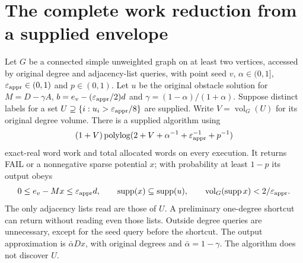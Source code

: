 \section{The complete work reduction from a supplied envelope}
\label{sec:op3-supplied-envelope-work}

\begin{theorem}
\label{thm:op3-supplied-envelope-work}
Let $G$ be a connected simple unweighted graph on at least two vertices,
accessed by original degree and adjacency-list queries, with point seed
$v$, $\alpha\in(0,1]$, $\varepsilon_{\mathrm{appr}}\in(0,1)$ and $p\in(0,1)$.
Let $u$ be the original obstacle solution for
$M=D-\gamma A$, $b=e_v-(\varepsilon_{\mathrm{appr}}/2)d$ and
$\gamma=(1-\alpha)/(1+\alpha)$. Suppose distinct labels for a set
$U\supseteq\{i:u_i>\varepsilon_{\mathrm{appr}}/8\}$ are supplied. Write
$V=\operatorname{vol}_G(U)$ for its original degree volume.
There is a supplied algorithm using
\[
 (1+V)\operatorname{polylog}
 (2+V+\alpha^{-1}+\varepsilon_{\mathrm{appr}}^{-1}+p^{-1})
\]
exact-real word work and total allocated words on every execution.
It returns \textnormal{FAIL} or a nonnegative sparse potential $x$;
with probability at least $1-p$ its output obeys
\[
 0\leq e_v-Mx\leq\varepsilon_{\mathrm{appr}} d,\qquad
 \operatorname{supp}(x)\subseteq\operatorname{supp}(u),\qquad
 \operatorname{vol}_G(\operatorname{supp}x)<2/\varepsilon_{\mathrm{appr}}.
\]
The only adjacency lists read are those of $U$. A preliminary one-degree
shortcut can return without reading even those lists. Outside degree
queries are unnecessary, except for the seed query before the shortcut.
The output approximation is $\bar\alpha Dx$, with original degrees and
$\bar\alpha=1-\gamma$. The algorithm does not discover $U$.
\end{theorem}
